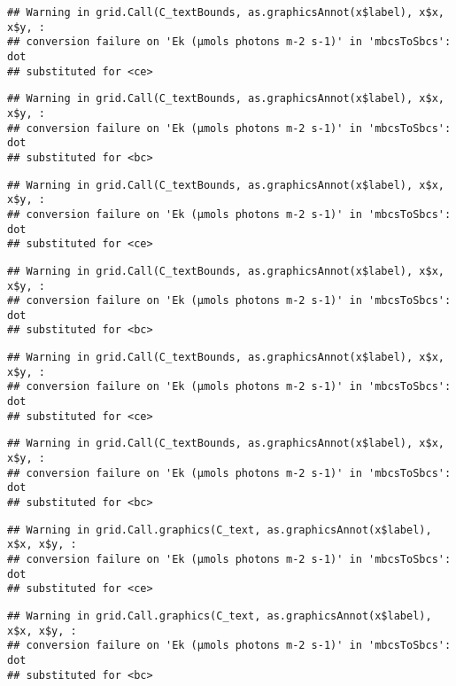 \documentclass[
]{article}
\begin{document}
\begin{verbatim}
## Warning in grid.Call(C_textBounds, as.graphicsAnnot(x$label), x$x, x$y, :
## conversion failure on 'Ek (μmols photons m-2 s-1)' in 'mbcsToSbcs': dot
## substituted for <ce>
\end{verbatim}

\begin{verbatim}
## Warning in grid.Call(C_textBounds, as.graphicsAnnot(x$label), x$x, x$y, :
## conversion failure on 'Ek (μmols photons m-2 s-1)' in 'mbcsToSbcs': dot
## substituted for <bc>
\end{verbatim}

\begin{verbatim}
## Warning in grid.Call(C_textBounds, as.graphicsAnnot(x$label), x$x, x$y, :
## conversion failure on 'Ek (μmols photons m-2 s-1)' in 'mbcsToSbcs': dot
## substituted for <ce>
\end{verbatim}

\begin{verbatim}
## Warning in grid.Call(C_textBounds, as.graphicsAnnot(x$label), x$x, x$y, :
## conversion failure on 'Ek (μmols photons m-2 s-1)' in 'mbcsToSbcs': dot
## substituted for <bc>
\end{verbatim}

\begin{verbatim}
## Warning in grid.Call(C_textBounds, as.graphicsAnnot(x$label), x$x, x$y, :
## conversion failure on 'Ek (μmols photons m-2 s-1)' in 'mbcsToSbcs': dot
## substituted for <ce>
\end{verbatim}

\begin{verbatim}
## Warning in grid.Call(C_textBounds, as.graphicsAnnot(x$label), x$x, x$y, :
## conversion failure on 'Ek (μmols photons m-2 s-1)' in 'mbcsToSbcs': dot
## substituted for <bc>
\end{verbatim}

\begin{verbatim}
## Warning in grid.Call.graphics(C_text, as.graphicsAnnot(x$label), x$x, x$y, :
## conversion failure on 'Ek (μmols photons m-2 s-1)' in 'mbcsToSbcs': dot
## substituted for <ce>
\end{verbatim}

\begin{verbatim}
## Warning in grid.Call.graphics(C_text, as.graphicsAnnot(x$label), x$x, x$y, :
## conversion failure on 'Ek (μmols photons m-2 s-1)' in 'mbcsToSbcs': dot
## substituted for <bc>
\end{verbatim}
\end{document}
